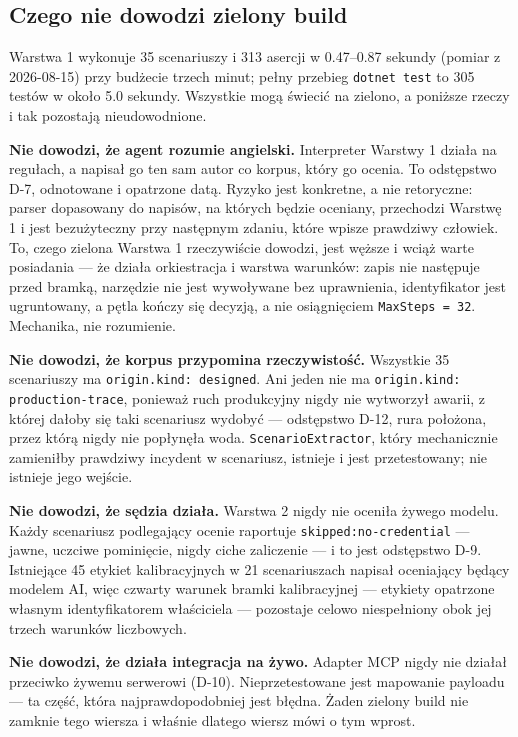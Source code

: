 \documentclass[11pt,a4paper]{article}
\begin{document}
\subsection{Czego nie dowodzi zielony build}

Warstwa 1 wykonuje 35 scenariuszy i 313 asercji w 0.47--0.87 sekundy (pomiar z
2026-08-15) przy budżecie trzech minut; pełny przebieg \texttt{dotnet test} to
305 testów w około 5.0 sekundy. Wszystkie mogą świecić na zielono, a poniższe
rzeczy i tak pozostają nieudowodnione.

\textbf{Nie dowodzi, że agent rozumie angielski.} Interpreter Warstwy 1 działa na
regułach, a napisał go ten sam autor co korpus, który go ocenia. To odstępstwo
D-7, odnotowane i opatrzone datą. Ryzyko jest konkretne, a nie retoryczne: parser
dopasowany do napisów, na których będzie oceniany, przechodzi Warstwę 1 i jest
bezużyteczny przy następnym zdaniu, które wpisze prawdziwy człowiek. To, czego
zielona Warstwa 1 rzeczywiście dowodzi, jest węższe i wciąż warte posiadania ---
że działa orkiestracja i warstwa warunków: zapis nie następuje przed bramką,
narzędzie nie jest wywoływane bez uprawnienia, identyfikator jest ugruntowany, a
pętla kończy się decyzją, a nie osiągnięciem \texttt{MaxSteps = 32}. Mechanika,
nie rozumienie.

\textbf{Nie dowodzi, że korpus przypomina rzeczywistość.} Wszystkie 35
scenariuszy ma \texttt{origin.kind: designed}. Ani jeden nie ma
\texttt{origin.kind: production-trace}, ponieważ ruch produkcyjny nigdy nie
wytworzył awarii, z której dałoby się taki scenariusz wydobyć --- odstępstwo
D-12, rura położona, przez którą nigdy nie popłynęła woda.
\texttt{ScenarioExtractor}, który mechanicznie zamieniłby prawdziwy incydent w
scenariusz, istnieje i jest przetestowany; nie istnieje jego wejście.

\textbf{Nie dowodzi, że sędzia działa.} Warstwa 2 nigdy nie oceniła żywego
modelu. Każdy scenariusz podlegający ocenie raportuje
\texttt{skipped:no-credential} --- jawne, uczciwe pominięcie, nigdy ciche
zaliczenie --- i to jest odstępstwo D-9. Istniejące 45 etykiet kalibracyjnych w
21 scenariuszach napisał oceniający będący modelem AI, więc czwarty warunek
bramki kalibracyjnej --- etykiety opatrzone własnym identyfikatorem właściciela
--- pozostaje celowo niespełniony obok jej trzech warunków liczbowych.

\textbf{Nie dowodzi, że działa integracja na żywo.} Adapter MCP nigdy nie działał
przeciwko żywemu serwerowi (D-10). Nieprzetestowane jest mapowanie payloadu ---
ta część, która najprawdopodobniej jest błędna. Żaden zielony build nie zamknie
tego wiersza i właśnie dlatego wiersz mówi o tym wprost.
\end{document}
